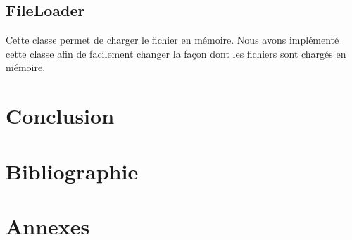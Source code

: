 \documentclass[utf8]{article}
\begin{document}
\begin{large}
\subsection{FileLoader}

Cette classe permet de charger le fichier en mémoire. Nous avons implémenté
cette classe afin de facilement changer la façon dont les fichiers sont chargés
en mémoire.

\section{Conclusion}
\indent
\par
\par

\section{Bibliographie}

\section{Annexes}

\end{large}
\end{document}
